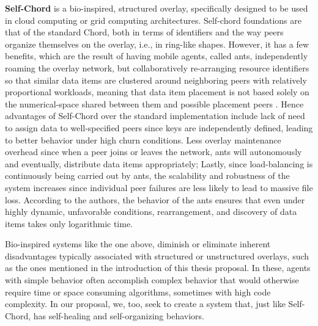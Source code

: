 \documentclass[runningheads]{llncs}
\begin{document}
\textbf{Self-Chord} is a bio-inspired, structured overlay, specifically designed to be used in cloud computing or grid computing architectures. Self-chord foundations are that of the standard Chord, both in terms of identifiers and the way peers organize themselves on the overlay, i.e., in ring-like shapes. However, it has a few benefits, which are the result of having mobile agents, called ants, independently roaming the overlay network, but collaboratively re-arranging resource identifiers so that similar data items are clustered around neighboring peers with relatively proportional workloads, meaning that data item placement is not based solely on the numerical-space shared between them and possible placement peers \cite{sotart, selfchord}. Hence advantages of Self-Chord over the standard implementation include lack of need to assign data to well-specified peers since keys are independently defined, leading to better behavior under high churn conditions. Less overlay maintenance overhead since when a peer joins or leaves the network, ants will autonomously and eventually, distribute data items appropriately; Lastly, since load-balancing is continuously being carried out by ants, the scalability and robustness of the system increases since individual peer failures are less likely to lead to massive file loss. According to the authors, the behavior of the ants ensures that even under highly dynamic, unfavorable conditions, rearrangement, and discovery of data items takes only logarithmic time.

Bio-inspired systems like the one above, diminish or eliminate inherent disadvantages typically associated with structured or unstructured overlays, such as the ones mentioned in the introduction of this thesis proposal. In these, agents with simple behavior often accomplish complex behavior that would otherwise require time or space consuming algorithms, sometimes with high code complexity. In our proposal, we, too, seek to create a system that, just like Self-Chord, has self-healing and self-organizing behaviors.
\end{document}

